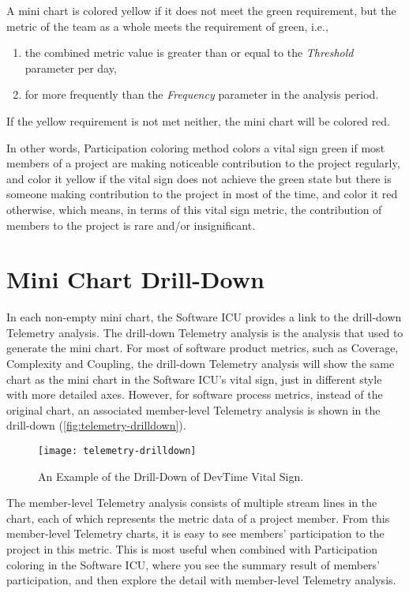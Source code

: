 A mini chart is colored yellow if it does not meet the green requirement, but the metric of the team as a whole meets the requirement of green, i.e., 
\begin{enumerate}
\item the combined metric value is greater than or equal to the {\it Threshold} parameter per day,
\item for more frequently than the {\it Frequency} parameter in the analysis period.
\end{enumerate}

If the yellow requirement is not met neither, the mini chart will be colored red.

In other words, Participation coloring method colors a vital sign green if most members of a project are making noticeable contribution to the project regularly, and color it yellow if the vital sign does not achieve the green state but there is someone making contribution to the project in most of the time, and color it red otherwise, which means, in terms of this vital sign metric, the contribution of members to the project is rare and/or insignificant.

\section{Mini Chart Drill-Down}
\label{drilldown}
In each non-empty mini chart, the Software ICU provides a link to the drill-down Telemetry analysis. The drill-down Telemetry analysis is the analysis that used to generate the mini chart. For most of software product metrics, such as Coverage, Complexity and Coupling, the drill-down Telemetry analysis will show the same chart as the mini chart in the Software ICU's vital sign, just in different style with more detailed axes. However, for software process metrics, instead of the original chart, an associated member-level Telemetry analysis is shown in the drill-down (\autoref{fig:telemetry-drilldown}). 

\begin{figure}[htbp]
   \centering
   \texttt{[image: telemetry-drilldown]}
   \caption{An Example of the Drill-Down of DevTime Vital Sign.}
   \label{fig:telemetry-drilldown}
\end{figure}

The member-level Telemetry analysis consists of multiple stream lines in the chart, each of which represents the metric data of a project member. From this member-level Telemetry charts, it is easy to see members' participation to the project in this metric. This is most useful when combined with Participation coloring in the Software ICU, where you see the summary result of members' participation, and then explore the detail with member-level Telemetry analysis.

